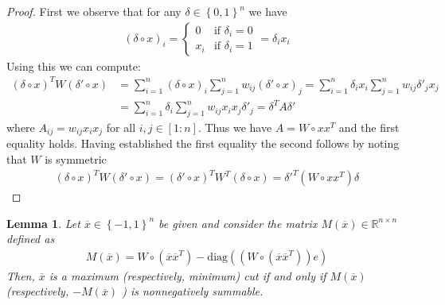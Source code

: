 \documentclass[12pt,a4paper]{article}
\theoremstyle{mythm}
\newtheorem{lem}[thm]{Lemma}
\begin{document}
\begin{proof}
First we observe that for any $ \delta \in \left\{ 0,1 \right\} ^{ n }  $ we have
\begin{align*}
\left( \delta \circ x \right) _{ i } = \begin{cases}
0 & \text{if } \delta_i = 0\\
x_i & \text{if } \delta_i = 1
\end{cases}
= \delta_i x_i
\end{align*} 
Using this we can compute:
\begin{align*}
\left( \delta \circ x \right) ^T W \left( \delta ' \circ x \right) 
&= \sum_{ i = 1 }^{ n } \left( \delta \circ x \right) _{ i } \sum_{ j = 1 }^{ n } w _{ ij } \left( \delta ' \circ x \right) _{ j } 
= \sum_{ i = 1 }^{ n } \delta _{ i } x_i \sum_{ j = 1 }^{ n } w _{ ij } \delta ' _{ j } x_j \\
&= \sum_{ i = 1 }^{ n } \delta_i \sum_{ j = 1 }^{ n } w _{ ij } x_i x_j \delta'_j = \delta ^T A \delta '
\end{align*} 
where $ A _{ ij } = w _{ ij } x_i x_j $ for all $ i,j \in \left[ 1:n \right]  $.
Thus we have $ A = W \circ xx ^T  $ and the first equality holds.
Having established the first equality the second follows by noting that $ W $ is symmetric
\begin{align*}
\left( \delta \circ x \right) ^T W  \left( \delta ' \circ x \right)  
= \left( \delta' \circ x \right) ^T W ^T \left( \delta \circ x \right) 
= \delta'^T \left( W \circ xx^T \right)  \delta
\end{align*} 
\end{proof}
\begin{lem}
\label{lem:M(x)nonnegsum} 
Let $ \overline{ x } \in \left\{ -1,1 \right\} ^{ n }  $ be given and consider the matrix $ M( \overline{ x } ) \in \mathbb{R} ^{ n \times n }  $ defined as 
\begin{align}
\label{def:M(x)} 
M ( \overline{ x }  ) = W \circ \left( \overline{  x} \overline{ x } ^{ T }  \right) - \text{diag} \left( \left( W \circ \left( \overline{ x } \overline{ x } ^T  \right)
\right) e  \right) 
\end{align} 
Then, $ \overline{ x }  $ is a maximum (respectively, minimum) cut if and only if $ M ( \overline{ x }  )  $ (respectively, $ -M ( \overline{ x }  )  $ )
is nonnegatively summable.
\end{lem} 
\end{document}
